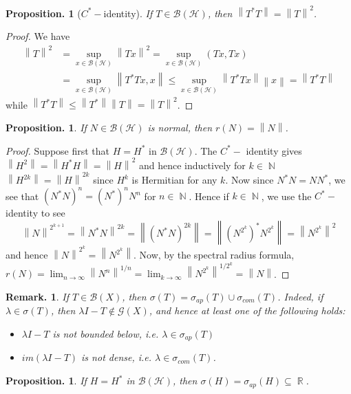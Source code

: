 \documentclass[11pt, a4paper]{memoir}
\DeclareMathOperator{\N}{{\mathbb{N}}}
\DeclareMathOperator{\R}{{\mathbb{R}}}
\newcommand{\norm}[1]{\ensuremath{\left\lVert#1\right\rVert}}
\theoremstyle{change}
\newtheorem{proposition}[theorem]{Proposition.}
\theoremstyle{plain}
\theoremstyle{nonumberplain}
\newtheorem{remark}{Remark.}
\newtheorem{proof}{Proof}
\newcommand{\inr}[1]{\ensuremath{\left(#1\right)}}
\numberwithin{equation}{section}
\begin{document}
\begin{proposition}[$C^*-$identity]
    If $T\in\mathcal{B}(\mathcal{H})$, then $\norm{T^*T}=\norm{T}^2$.
\end{proposition}
\begin{proof}
    We have
    \begin{align*}
        \norm{T}^2 &= \sup_{x\in\mathcal{B}(\mathcal{H})}\norm{Tx}^2 = \sup_{x\in\mathcal{B}(\mathcal{H})}\inr{Tx,Tx}\\
                   &= \sup_{x\in\mathcal{B}(\mathcal{H})}\norm{T^*Tx,x} \leq\sup_{x\in\mathcal{B}(\mathcal{H})}\norm{T^*Tx}{\norm{x}}=\norm{T^*T}
    \end{align*}
    while $\norm{T^*T}\leq\norm{T^*}\norm{T}=\norm{T}^2$.
\end{proof}
\begin{proposition}
    If $N\in\mathcal{B}(\mathcal{H})$ is normal, then $r(N)=\norm{N}$.
\end{proposition}
\begin{proof}
    Suppose first that $H=H^*$ in $\mathcal{B}(\mathcal{H})$.
    The $C^*-$ identity gives $\norm{H^2}=\norm{H^*H}=\norm{H}^2$ and hence inductively for $k\in\N$ $\norm{H^{2k}}=\norm{H}^{2k}$ since $H^k$ is Hermitian for any $k$.
    Now since $N^*N=NN^*$, we see that $(N^*N)^n=(N^*)^nN^n$ for $n\in\N$.
    Hence if $k\in\N$, we use the $C^*-$identity to see
    \begin{equation*}
        \norm{N}^{2^{k+1}}=\norm{N^*N}^{2k}=\norm{(N^*N)^{2k}}=\norm{(N^{2^k})^*N^{2^k}}=\norm{N^{2^k}}^2
    \end{equation*}
    and hence $\norm{N}^{2^k}=\norm{N^{2^k}}$.
    Now, by the spectral radius formula, $r(N)=\lim_{n\to\infty}\norm{N^n}^{1/n}=\lim_{k\to\infty}\norm{N^{2^k}}^{1/2^k}=\norm{N}$.
\end{proof}
\begin{remark}
    If $T\in\mathcal{B}(X)$, then $\sigma(T)=\sigma_{ap}(T)\cup\sigma_{com}(T)$.
    Indeed, if $\lambda\in\sigma(T)$, then $\lambda I-T\notin\mathcal{G}(X)$, and hence at least one of the following holds:
    \begin{itemize}[nl]
        \item $\lambda I-T$ is not bounded below, i.e. $\lambda\in\sigma_{ap}(T)$
        \item $im(\lambda I -T)$ is not dense, i.e. $\lambda\in\sigma_{com}(T)$.
    \end{itemize}
\end{remark}
\begin{proposition}
    If $H=H^*$ in $\mathcal{B}(\mathcal{H})$, then $\sigma(H)=\sigma_{ap}(H)\subseteq\R$.
\end{proposition}
\end{document}

